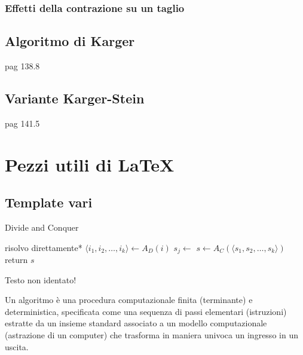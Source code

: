 \subsubsection{Effetti della contrazione su un taglio}

\subsection{Algoritmo di Karger}
pag 138.8

\subsection{Variante Karger-Stein}
pag 141.5

\section{Pezzi utili di \LaTeX{}}

\subsection{Template vari}

\begin{algorithm}[H]
\caption{Divide and Conquer}\label{alg:dnc}
\begin{algorithmic}[1]
            \State *risolvo direttamente*
        \EndIf
        \State $\langle i_1, i_2, \dots, i_k \rangle \gets A_D(i)$ 
            \State $s_j \gets $
        \EndFor
        \State $s \gets A_C(\langle s_1, s_2, \dots, s_k \rangle)$
        \State return $s$
    \EndProcedure
\end{algorithmic}
\end{algorithm}
\noindent
Testo non identato!

\begin{definition}[Algoritmo]\label{def:algex}
    Un algoritmo è una procedura computazionale finita (terminante) e deterministica, specificata come una sequenza di passi elementari (istruzioni) estratte da un insieme standard associato a un modello computazionale (astrazione di un computer) che trasforma in maniera univoca un ingresso in un uscita.
\end{definition}

